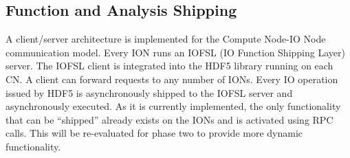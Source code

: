 \documentclass{sig-alt-gov2}
\begin{document}
\subsection{Function and Analysis Shipping}
\label{sec:fn-shipping}

A client/server architecture is implemented for the Compute Node-IO Node
communication model.  Every ION runs an IOFSL (IO Function Shipping Layer)
server. The IOFSL client is integrated into the HDF5 library running on each
CN. A client can forward requests to any number of IONs. Every IO operation
issued by HDF5 is asynchronously shipped to the IOFSL server and asynchronously
executed. As it is currently implemented, the only functionality that can be
``shipped'' already exists on the IONs and is activated using RPC calls. This
will be re-evaluated for phase two to provide more dynamic functionality.
\end{document}
